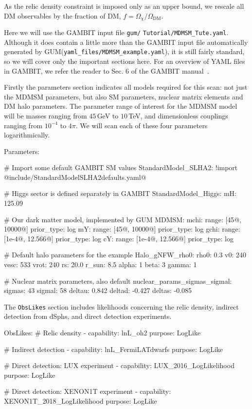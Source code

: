 \documentclass[pdftex,twocolumn,epjc3_preprint,runningheads]{svjour3}
\renewcommand{\_}{\discretionary{\underscore}{}{\underscore}}
\newcommand\yaml[1]{{\lstset{style=yaml}\lstinline!#1!\lstset{style=cpp}}}
\newcommand\yamlvalue[1]{{\YAMLvaluestyle\ttfamily#1}}
\newcommand\term[1]{{\lstset{style=terminal}\lstinline!#1!\lstset{style=cpp}}}
\newcommand\YAMLvaluestyle{\footnotesize\color{blue}\mdseries}
\newcommand{\gambit}{\textsf{GAMBIT}\xspace}
\newcommand{\GB}{\gambit}
\newcommand{\gum}{\textsf{GUM}\xspace}
\newcommand\YAML{\textsf{YAML}\xspace}
\begin{document}
As the relic density constraint is imposed only as an upper bound, we rescale all DM observables by the fraction of DM, $f=\Omega_\chi/\Omega_\textrm{DM}$.

Here we will use the \GB input file \term{gum/} \term{Tutorial/MDMSM_Tute.yaml}. Although it does contain a little more than the \GB input file automatically generated by \gum (\term{yaml_files/MDMSM_example.yaml}), it is still fairly standard, so we will cover only the important sections here. For an overview of \YAML files in \GB, we refer the reader to Sec. 6 of the \GB manual~\cite{gambit}.

Firstly the parameters section indicates
all models required for this scan: not just the MDMSM parameters, but also SM parameters, nuclear matrix elements and DM halo parameters. The parameter range of interest for the MDMSM model will be masses ranging from $45$\,GeV to $10$\,TeV, and dimensionless couplings ranging from $10^{-4}$ to $4\pi$.  We will scan each of these four parameters logarithmically.
%
\begin{lstyaml}
Parameters:

  # Import some default GAMBIT SM values
  StandardModel_SLHA2: !import
   @\yamlvalue{include/StandardModel\_SLHA2\_defaults.yaml}@

  # Higgs sector is defined separately in GAMBIT
  StandardModel_Higgs:
    mH: 125.09

  # Our dark matter model, implemented by GUM
  MDMSM:
    mchi:
      range: [45@\yamlvalue{, 10000}@]
      prior_type: log
    mY:
      range: [45@\yamlvalue{, 10000}@]
      prior_type: log
    gchi:
      range: [1e-4@\yamlvalue{, 12.566}@]
      prior_type: log
    cY:
      range: [1e-4@\yamlvalue{, 12.566}@]
      prior_type: log

  # Default halo parameters for the example
  Halo_gNFW_rho0:
    rho0: 0.3
    v0: 240
    vesc: 533
    vrot: 240
    rs: 20.0
    r_sun: 8.5
    alpha: 1
    beta: 3
    gamma: 1

  # Nuclear matrix parameters, also default
  nuclear_params_sigmas_sigmal:
    sigmas: 43
    sigmal: 58
    deltau: 0.842
    deltad: -0.427
    deltas: -0.085
\end{lstyaml}
The \yaml{ObsLikes} section includes likelihoods concerning the relic density, indirect detection from dSphs, and direct detection experiments.
%
\begin{lstyaml}
ObsLikes:
    # Relic density
    - capability: lnL_oh2
      purpose:    LogLike

    # Indirect detection
    - capability: lnL_FermiLATdwarfs
      purpose:    LogLike

    # Direct detection: LUX experiment
    - capability: LUX_2016_LogLikelihood
      purpose:    LogLike

    # Direct detection: XENON1T experiment
    - capability: XENON1T_2018_LogLikelihood
      purpose:    LogLike
\end{lstyaml}
\end{document}
